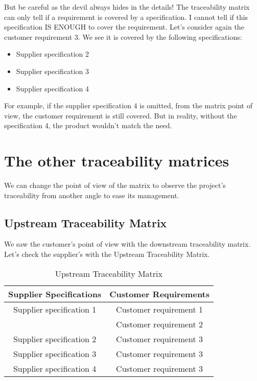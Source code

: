 But be careful as the devil always hides in the details! The traceability matrix can only tell if a requirement is covered by a specification. I cannot tell if this specification IS ENOUGH to cover the requirement.
Let’s consider again the customer requirement 3. We see it is covered by the following specifications:

\begin{itemize}
    \item Supplier specification 2
    \item Supplier specification 3
    \item Supplier specification 4
\end{itemize}

For example, if the supplier specification 4 is omitted, from the matrix point of view, the customer requirement is still covered. But in reality, without the specification 4, the product wouldn’t match the need.

\section{The other traceability matrices}
We can change the point of view of the matrix to observe the project’s traceability from another angle to ease its management.

\subsection{Upstream Traceability Matrix}
We saw the customer’s point of view with the downstream traceability matrix. Let’s check the supplier’s with the Upstream Traceability Matrix.

\begin{table*}
	\centering
		\begin{tabular}{|c|c|}
			\hline
			Supplier Specifications & Customer Requirements\\
            \hline
            Supplier specification 1 & Customer requirement 1\\
            & Customer requirement 2\\
            \hline
            Supplier specification 2 & Customer requirement 3\\
            \hline
            Supplier specification 3 & Customer requirement 3\\
            \hline
            Supplier specification 4 & Customer requirement 3\\
            \hline
		\end{tabular}
	\caption{Upstream Traceability Matrix}
	\label{tab:UpstreamTraceabilityMatrix}
\end{table*}


